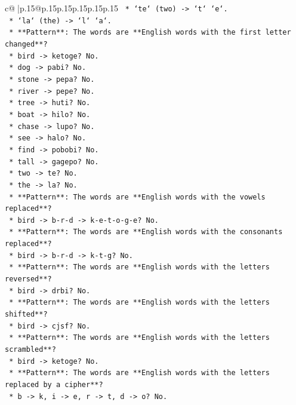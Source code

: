 \documentclass{article}
\begin{document}
{\begin{supertabular}{c@{$\;$}|p{.15\linewidth}@{}p{.15\linewidth}p{.15\linewidth}p{.15\linewidth}p{.15\linewidth}p{.15\linewidth}}
{{{\texttt{    *   `te` (two) {-}> `t` `e`.} \\
\texttt{    *   `la` (the) {-}> `l` `a`.} \\
\texttt{    *   **Pattern**: The words are **English words with the first letter changed**?} \\
\texttt{    *   bird {-}> ketoge? No.} \\
\texttt{    *   dog {-}> pabi? No.} \\
\texttt{    *   stone {-}> pepa? No.} \\
\texttt{    *   river {-}> pepe? No.} \\
\texttt{    *   tree {-}> huti? No.} \\
\texttt{    *   boat {-}> hilo? No.} \\
\texttt{    *   chase {-}> lupo? No.} \\
\texttt{    *   see {-}> halo? No.} \\
\texttt{    *   find {-}> pobobi? No.} \\
\texttt{    *   tall {-}> gagepo? No.} \\
\texttt{    *   two {-}> te? No.} \\
\texttt{    *   the {-}> la? No.} \\
\texttt{    *   **Pattern**: The words are **English words with the vowels replaced**?} \\
\texttt{    *   bird {-}> b{-}r{-}d {-}> k{-}e{-}t{-}o{-}g{-}e? No.} \\
\texttt{    *   **Pattern**: The words are **English words with the consonants replaced**?} \\
\texttt{    *   bird {-}> b{-}r{-}d {-}> k{-}t{-}g? No.} \\
\texttt{    *   **Pattern**: The words are **English words with the letters reversed**?} \\
\texttt{    *   bird {-}> drbi? No.} \\
\texttt{    *   **Pattern**: The words are **English words with the letters shifted**?} \\
\texttt{    *   bird {-}> cjsf? No.} \\
\texttt{    *   **Pattern**: The words are **English words with the letters scrambled**?} \\
\texttt{    *   bird {-}> ketoge? No.} \\
\texttt{    *   **Pattern**: The words are **English words with the letters replaced by a cipher**?} \\
\texttt{    *   b {-}> k, i {-}> e, r {-}> t, d {-}> o? No.} \\
}}}
\end{supertabular}}
\end{document}
